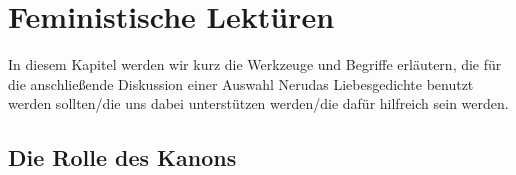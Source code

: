 \section{Feministische Lektüren}


In diesem Kapitel werden wir kurz die Werkzeuge und Begriffe erläutern, die für die anschließende Diskussion einer Auswahl Nerudas Liebesgedichte benutzt werden sollten/die uns dabei unterstützen werden/die dafür hilfreich sein werden.

\begin{comment}
feminist criticism very quickly moved
beyond merely "expos[ing] sexism in one work of literature after
another"\cite{Kolodny1980}
--> Tu ich das? Merely exposing sexism in one work of literature? Ist es ok? mach ich vlt sonst was anderes?
\end{comment}


\begin{comment}
  [Kolodny1980]
  feministische literaturkritik wird anscheinend zur sau gemacht, weil sie kein system/program hat: "lack of systematic coherence"
  das ist auch gleichzeitig die stärke der bewegung: diversity, pluralism
  ``All the feminist is asserting, then, is her own equivalent
  right to liberate new (and perhaps different) significances from
  these same texts; and, at the same time, her right to choose which
  features of a text she takes as relevant because she is, after all, ask-
  ing new and different questions of it.''~\cite{Kolodny1980}
  ``Robert Scholes, from whom I've been quoting, goes so far as to assert
  that "there is no single 'right' reading for any complex literary
  work,"''
  ``we entertain the possibility
  that different readings, even of the same text, may be differently
  useful, even illuminating, within different contexts of inquiry.''
  ``what we give up is simply the arrogance of
  claiming that our work is either exhaustive or definitive.''
  ``If feminist criticism calls anything into
  question, it must be that dog-eared myth of intellectual neutrality.''
\end{comment}

\subsection{Die Rolle des Kanons}


